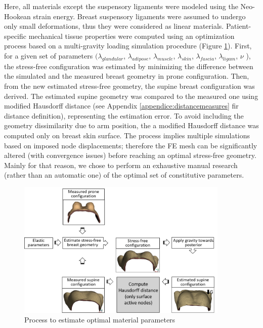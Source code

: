  Here, all materials except the suspensory ligaments were modeled using the Neo-Hookean strain energy. Breast suspensory ligaments were assumed to undergo only small deformations, thus they were considered as linear materials.  Patient-specific mechanical tissue properties were computed using an optimization process based on a multi-gravity loading simulation procedure (Figure \ref{fig:optimizationalgo}). First, for a given set of parameters $(\lambda_{glandular}$, $\lambda_{adipose}$, $ \lambda_{muscle}$,  $\lambda_{skin}$, $\lambda_{fascia}$, $\lambda_{ligam}$, $\nu$ ), the stress-free configuration was estimated by minimizing the difference between the simulated and the measured breast geometry in prone configuration. Then, from the new estimated stress-free geometry, the supine breast configuration was derived. The estimated supine geometry was compared to the measured one using modified Hausdorff distance (see Appendix \ref{appendice:distancemeasures} fir distance definition), representing the estimation error.  To avoid including the geometry dissimilarity due to arm position, the a modified Hausdorff distance was computed only on breast skin surface.  
The process implies multiple simulations based on imposed node displacements; therefore the FE mesh can be significantly altered (with convergence issues) before reaching an optimal stress-free geometry. Mainly for that reason, we chose to perform an exhaustive manual research (rather than an automatic one) of the optimal set of constitutive parameters. 


\begin{figure}[!h]
\centering
\includegraphics[width=0.9\textwidth,keepaspectratio]{figures/optimizationMaterialParameters.png} 
\caption{Process to estimate optimal material parameters}\label{fig:optimizationalgo}
\end{figure}
 
